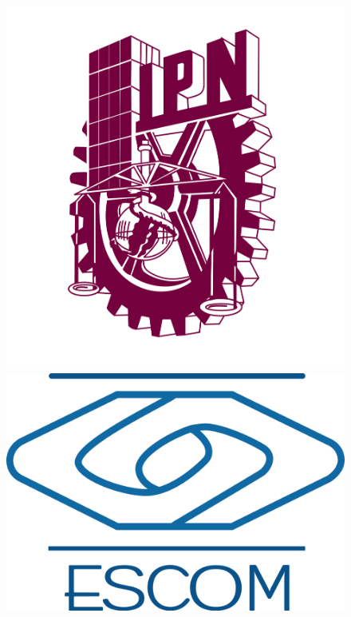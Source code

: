 \documentclass[11pt,a4paper]{report}
\numberwithin{equation}{section}
\begin{document}
	\newpage
	\begin{titlepage}
		\centering
		\begin{figure}[!tbp]
			\centering 
			\begin{minipage}[b]{0.4\textwidth}
				\includegraphics[width=\textwidth]{./img/logos/ipn.png}
			\end{minipage}
			\hfill
			\begin{minipage}[b]{0.5\textwidth}
				\includegraphics[width=\textwidth]{./img/logos/escom.png}

\end{minipage}
\end{figure}
\end{titlepage}
\end{document}
